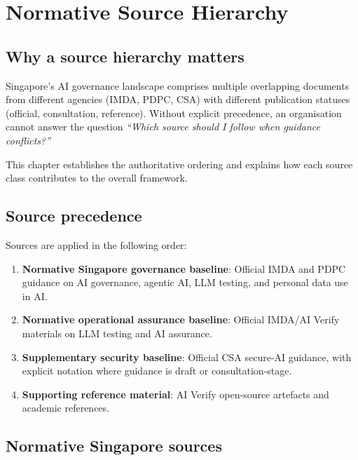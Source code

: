 \chapter{Normative Source Hierarchy}
\label{ch:sources}

\section{Why a source hierarchy matters}

Singapore's AI governance landscape comprises multiple overlapping documents
from different agencies (IMDA, PDPC, CSA) with different publication statuses
(official, consultation, reference). Without explicit precedence, an
organisation cannot answer the question \emph{``Which source should I follow
when guidance conflicts?''}

This chapter establishes the authoritative ordering and explains how each
source class contributes to the overall framework.

\section{Source precedence}

Sources are applied in the following order:

\begin{enumerate}
  \item \textbf{Normative Singapore governance baseline}: Official IMDA and
        PDPC guidance on AI governance, agentic AI, LLM testing, and personal
        data use in AI.
  \item \textbf{Normative operational assurance baseline}: Official IMDA/AI
        Verify materials on LLM testing and AI assurance.
  \item \textbf{Supplementary security baseline}: Official CSA secure-AI
        guidance, with explicit notation where guidance is draft or
        consultation-stage.
  \item \textbf{Supporting reference material}: AI Verify open-source
        artefacts and academic references.
\end{enumerate}

\section{Normative Singapore sources}

